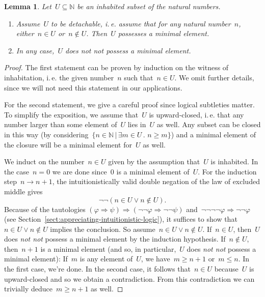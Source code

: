 \documentclass[10pt]{amsart}
\makeatletter
\theoremstyle{definition}
\theoremstyle{plain}
\newtheorem{lemma}[defn]{Lemma}
\theoremstyle{remark}
\newcommand{\NN}{\mathbb{N}}
\newcommand{\?}{\,{:}\,}
\renewcommand{\_}{\mathpunct{.}\,}
\newcommand{\ie}{i.\,e.\@\xspace}
\newcommand{\notnot}{\emph{not not}\xspace}
\makeatother
\begin{document}
\begin{lemma}\label{lemma:minimum-subset-naturals}
Let~$U \subseteq \NN$ be an inhabited subset of the natural
numbers.
\begin{enumerate}
\item Assume~$U$ to be \emph{detachable}, \ie assume that for any natural
number~$n$, either~$n \in U$ or~$n \not\in U$. Then~$U$ possesses a minimal
element.
\item In any case,~$U$ does \emph{not not} possess a minimal element.
\end{enumerate}
\end{lemma}
\begin{proof}
The first statement can be proven by induction on the witness of inhabitation,
\ie the given number~$n$ such that~$n \in U$. We omit further details, since we will
not need this statement in our applications.

For the second statement, we give a careful proof since logical subtleties matter. To simplify the
exposition, we assume that~$U$ is upward-closed, \ie that any number
larger than some element of~$U$ lies in~$U$ as well. Any subset can be closed
in this way (by considering~$\{ n \in \NN \,|\, \exists m \in U\_ n \geq m \}$)
and a minimal element of the closure will be a minimal element for~$U$ as well.

We induct on the number~$n \in U$ given by the assumption that~$U$ is
inhabited. In the case~$n = 0$ we are done since~$0$ is a minimal element
of~$U$. For the induction step~$n \to n+1$, the intuitionistically valid double
negation of the law of excluded middle
gives
\[ \neg\neg(n \in U \vee n \not\in U). \]
Because of the tautologies $(\varphi \Rightarrow \psi) \Rightarrow
(\neg\neg\varphi \Rightarrow \neg\neg\psi)$ and~$\neg\neg\neg\neg\varphi \Rightarrow
\neg\neg\varphi$ (see Section~\ref{sect:appreciating-intuitionistic-logic}), it
suffices to show that~$n \in U \vee n \not\in U$ implies the conclusion.
So assume~$n \in U \vee n \not\in U$.
If~$n \in U$, then~$U$ does \notnot possess a minimal element by the induction
hypothesis. If~$n \not\in U$, then~$n+1$ is a minimal element (and so, in
particular,~$U$ does \notnot possess a minimal element): If~$m$ is
any element of~$U$, we have~$m \geq n+1$ or~$m \leq n$. In the first case,
we're done. In the second case, it follows that~$n \in U$ because~$U$ is
upward-closed and so we obtain a contradiction. From this contradiction we
can trivially deduce~$m \geq n+1$ as well. \qedhere
\end{proof}
\end{document}
